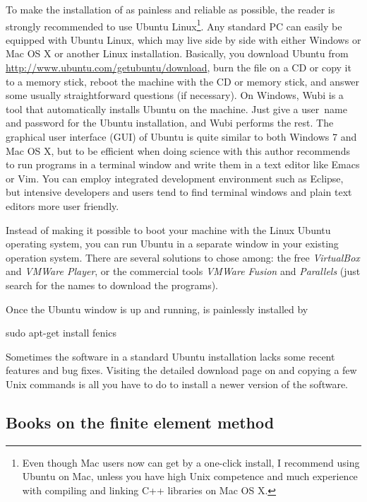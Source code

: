 To make the installation of \fenics{} as painless and reliable
as possible, the reader is strongly recommended to use Ubuntu
Linux\footnote{Even though Mac users now can get \fenics{} by a
  one-click install, I recommend using Ubuntu on Mac, unless you have
  high Unix competence and much experience with compiling and linking C++
  libraries on Mac OS X.}. Any standard PC can easily be equipped
with Ubuntu Linux, which may live side by side with either Windows
or Mac OS X or another Linux installation.  Basically, you download
Ubuntu from \url{http://www.ubuntu.com/getubuntu/download}, burn the
file on a CD or copy it to a memory stick,
reboot the machine with the CD or memory stick, and answer some usually
straightforward questions (if necessary).
On Windows, Wubi is a tool that automatically installs
Ubuntu on the machine. Just give a user~name and password for the
Ubuntu installation, and Wubi performs the rest.
The graphical user interface
(GUI) of Ubuntu is quite similar to both Windows 7 and Mac OS X, but to
be efficient when doing science with \fenics{} this author recommends
to run programs in a terminal window and write them in a text editor
like Emacs or Vim. You can employ integrated development environment
such as Eclipse, but intensive \fenics{} developers and users tend to
find terminal windows and plain text editors more user friendly.

Instead of making it possible to boot your machine with the Linux
Ubuntu operating system, you can run Ubuntu in a separate window in
your existing operation system. There are several solutions to chose
among: the free \emph{VirtualBox} and \emph{VMWare Player}, or the
commercial tools \emph{VMWare Fusion} and \emph{Parallels} (just
search for the names to download the programs).

Once the Ubuntu window is up and running, \fenics{} is painlessly
installed by
\begin{bash}
sudo apt-get install fenics
\end{bash}
Sometimes the \fenics{} software in a standard Ubuntu installation
lacks some recent features and bug fixes. Visiting the detailed
download page on  and copying a few Unix
commands is all you have to do to install a newer version of the
software.


\subsection{Books on the finite element method}
\label{langtangen:appendix:books}

